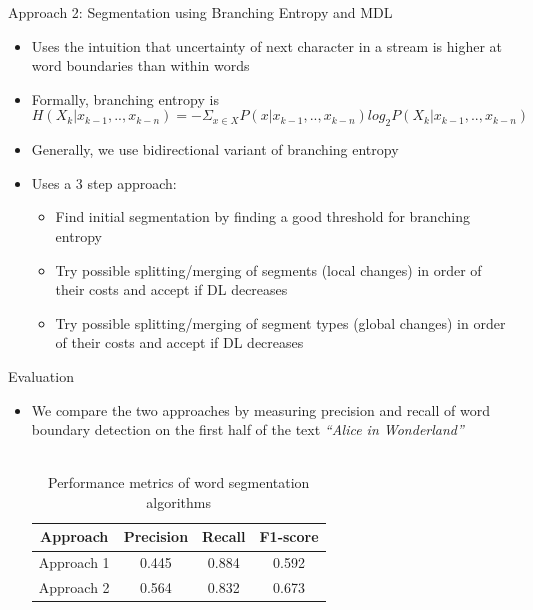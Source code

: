 \documentclass{beamer}
\begin{document}
\begin{frame}{Approach 2: Segmentation using Branching Entropy and MDL}
	\begin{itemize}
		\item Uses the intuition that uncertainty of next character in a stream is higher at word boundaries than within words
		\item Formally, branching entropy is
			$$H(X_k|x_{k-1},..,x_{k-n}) = - \Sigma_{x \in X} P(x|x_{k-1},..,x_{k-n})log_2 P(X_k|x_{k-1},..,x_{k-n})$$
		\item Generally, we use bidirectional variant of branching entropy
		\item Uses a 3 step approach:
			\begin{itemize}
				\item Find initial segmentation by finding a good threshold for branching entropy
				\item Try possible splitting/merging of segments (local changes) in order of their costs and accept if DL decreases
				\item Try possible splitting/merging of segment types (global changes) in order of their costs and accept if DL decreases
			\end{itemize}
	\end{itemize}
\end{frame}

\begin{frame}{Evaluation}
	\begin{itemize}
		\item We compare the two approaches by measuring precision and recall of word boundary detection on the first half of the text \textit{``Alice in Wonderland''} \\
		\ \\
		\begin{table}[H]
		\centering
		\begin{tabular}{ c | c c c}\hline
		\textbf{Approach} & \textbf{Precision} & \textbf{Recall} & \textbf{F1-score} \\ \hline
		Approach 1 & 0.445 & 0.884 & 0.592 \\ 
		Approach 2 & 0.564 & 0.832 & 0.673 \\ 
		\end{tabular}
		\caption{Performance metrics of word segmentation algorithms}
		\label{tab:perf_word_seg}
		\end{table}
	\end{itemize}
\end{frame}
\end{document}
